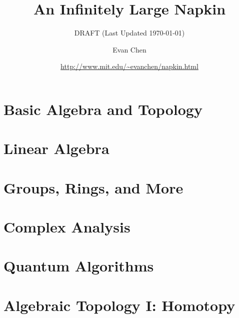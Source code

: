 \documentclass[11pt,numbers=noenddot]{scrreprt}
\begin{document}
\doparttoc[n]

\title{An Infinitely Large Napkin}
\subtitle{DRAFT (Last Updated \today)}
\author{Evan Chen}
\date{\url{http://www.mit.edu/~evanchen/napkin.html}}
\maketitle




\tableofcontents



\part{Basic Algebra and Topology}






\part{Linear Algebra}





\part{Groups, Rings, and More}





\part{Complex Analysis}



%

\part{Quantum Algorithms}



\part{Algebraic Topology I: Homotopy}
 

\end{document}

